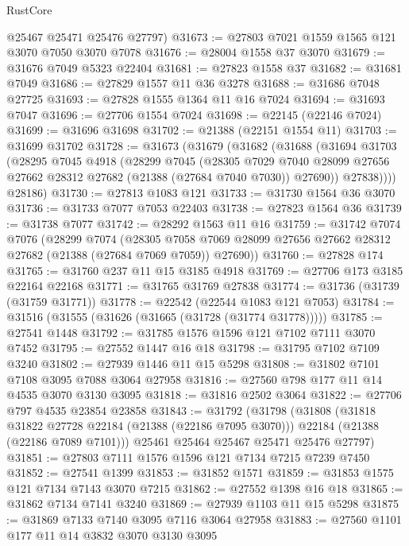 \begin{lexlean}{RustCore}
\begin{coremodule}
      @25467
      @25471
      @25476
      @27797)
@31673 := @27803 @7021 @1559 @1565 @121 @3070 @7050 @3070 @7078
@31676 := @28004 @1558 @37 @3070
@31679 := @31676 @7049 @5323 @22404
@31681 := @27823 @1558 @37
@31682 := @31681 @7049
@31686 := @27829 @1557 @11 @36 @3278
@31688 := @31686 @7048 @27725
@31693 := @27828 @1555 @1364 @11 @16 @7024
@31694 := @31693 @7047
@31696 := @27706 @1554 @7024
@31698 := @22145 (@22146 @7024)
@31699 := @31696 @31698
@31702 := @21388 (@22151 @1554 @11)
@31703 := @31699 @31702
@31728 := @31673
    (@31679
      (@31682
        (@31688
          (@31694
            @31703
            (@28295
              @7045
              @4918
              (@28299
                @7045
                (@28305
                  @7029
                  @7040
                  @28099
                  @27656
                  @27662
                  @28312
                  @27682
                  (@21388 (@27684 @7040 @7030))
                  @27690))
              @27838))))
      @28186)
@31730 := @27813 @1083 @121
@31733 := @31730 @1564 @36 @3070
@31736 := @31733 @7077 @7053 @22403
@31738 := @27823 @1564 @36
@31739 := @31738 @7077
@31742 := @28292 @1563 @11 @16
@31759 := @31742
    @7074
    @7076
    (@28299
      @7074
      (@28305 @7058 @7069 @28099 @27656 @27662 @28312 @27682 (@21388 (@27684 @7069 @7059)) @27690))
@31760 := @27828 @174
@31765 := @31760 @237 @11 @15 @3185 @4918
@31769 := @27706 @173 @3185 @22164 @22168
@31771 := @31765 @31769 @27838
@31774 := @31736 (@31739 (@31759 @31771))
@31778 := @22542 (@22544 @1083 @121 @7053)
@31784 := @31516 (@31555 (@31626 (@31665 (@31728 (@31774 @31778)))))
@31785 := @27541 @1448
@31792 := @31785 @1576 @1596 @121 @7102 @7111 @3070 @7452
@31795 := @27552 @1447 @16 @18
@31798 := @31795 @7102 @7109 @3240
@31802 := @27939 @1446 @11 @15 @5298
@31808 := @31802 @7101 @7108 @3095 @7088 @3064 @27958
@31816 := @27560 @798 @177 @11 @14 @4535 @3070 @3130 @3095
@31818 := @31816 @2502 @3064
@31822 := @27706 @797 @4535 @23854 @23858
@31843 := @31792
    (@31798
      (@31808
        (@31818 @31822 @27728 @22184 (@21388 (@22186 @7095 @3070)))
        @22184
        (@21388 (@22186 @7089 @7101)))
      @25461
      @25464
      @25467
      @25471
      @25476
      @27797)
@31851 := @27803 @7111 @1576 @1596 @121 @7134 @7215 @7239 @7450
@31852 := @27541 @1399
@31853 := @31852 @1571
@31859 := @31853 @1575 @121 @7134 @7143 @3070 @7215
@31862 := @27552 @1398 @16 @18
@31865 := @31862 @7134 @7141 @3240
@31869 := @27939 @1103 @11 @15 @5298
@31875 := @31869 @7133 @7140 @3095 @7116 @3064 @27958
@31883 := @27560 @1101 @177 @11 @14 @3832 @3070 @3130 @3095

\end{coremodule}
\end{lexlean}
